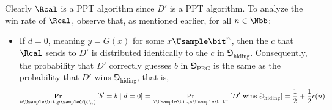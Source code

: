 \begin{answer}[b]
    Clearly $\Rcal$ is a PPT algorithm since $D'$ is a PPT algorithm.
    To analyze the win rate of $\Rcal$, observe that, as mentioned earlier, for all $n\in\Nbb$:
    \begin{itemize}
        \item If $d=0$, meaning $y=G(x)$ for some $x \Usample \bit^n$, then the $c$ that $\Rcal$ sends to $D'$ is distributed identically to the $c$ in $\Game_{\textrm{hiding}}$. Consequently, the probability that $D'$ correctly guesses $b$ in $\Game_{\textrm{PRG}}$ is the same as the probability that $D'$ wins $\Game_{\textrm{hiding}}$, that is,
        \begin{equation}\label{eq:p6-2-2}
            \Pr_{b\Usample\bit,y\sample G(U_n)}\left[ b'=b \mid d=0\right]
            =\Pr_{b\Usample\bit,s \Usample \bit^n}\left[ D' \textrm{ wins } \Game_{\textrm{hiding}}\right]
            =\frac{1}{2}+\frac{1}{2}\epsilon(n).
        \end{equation}


\end{itemize}
\end{answer}
